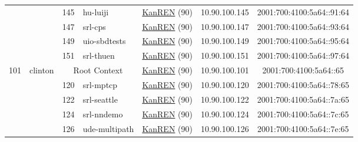 \begin{small}
\begin{center}
\begin{longtable}{|c|c|c|c|c|c|c|c|}
  &  & \tiny{145} & \multicolumn{1}{|l|}{\tiny{hu-luiji}} & \multicolumn{2}{|c|}{\tiny{\href{http://www.kanren.net}{KanREN} (90)}} & \tiny{10.90.100.145} & \tiny{2001:700:4100:5a64::91:64} \\* \cline{3-3}\cline{4-4}\cline{5-5}\cline{6-6}\cline{7-7}\cline{8-8}
  &  & \tiny{147} & \multicolumn{1}{|l|}{\tiny{srl-cps}} & \multicolumn{2}{|c|}{\tiny{\href{http://www.kanren.net}{KanREN} (90)}} & \tiny{10.90.100.147} & \tiny{2001:700:4100:5a64::93:64} \\* \cline{3-3}\cline{4-4}\cline{5-5}\cline{6-6}\cline{7-7}\cline{8-8}
  &  & \tiny{149} & \multicolumn{1}{|l|}{\tiny{uio-sbdtests}} & \multicolumn{2}{|c|}{\tiny{\href{http://www.kanren.net}{KanREN} (90)}} & \tiny{10.90.100.149} & \tiny{2001:700:4100:5a64::95:64} \\* \cline{3-3}\cline{4-4}\cline{5-5}\cline{6-6}\cline{7-7}\cline{8-8}
  &  & \tiny{151} & \multicolumn{1}{|l|}{\tiny{srl-thuen}} & \multicolumn{2}{|c|}{\tiny{\href{http://www.kanren.net}{KanREN} (90)}} & \tiny{10.90.100.151} & \tiny{2001:700:4100:5a64::97:64} \\ \hline
 \multirow{17}{*}{\tiny{101}} & \multicolumn{1}{|l|}{\multirow{17}{*}{\tiny{clinton}}} & \multicolumn{2}{|c|}{\tiny{Root Context}} & \multicolumn{2}{|c|}{\tiny{\href{http://www.kanren.net}{KanREN} (90)}} & \tiny{10.90.100.101} & \tiny{2001:700:4100:5a64::65} \\* \cline{3-3}\cline{4-4}\cline{5-5}\cline{6-6}\cline{7-7}\cline{8-8}
  &  & \tiny{120} & \multicolumn{1}{|l|}{\tiny{srl-mptcp}} & \multicolumn{2}{|c|}{\tiny{\href{http://www.kanren.net}{KanREN} (90)}} & \tiny{10.90.100.120} & \tiny{2001:700:4100:5a64::78:65} \\* \cline{3-3}\cline{4-4}\cline{5-5}\cline{6-6}\cline{7-7}\cline{8-8}
  &  & \tiny{122} & \multicolumn{1}{|l|}{\tiny{srl-seattle}} & \multicolumn{2}{|c|}{\tiny{\href{http://www.kanren.net}{KanREN} (90)}} & \tiny{10.90.100.122} & \tiny{2001:700:4100:5a64::7a:65} \\* \cline{3-3}\cline{4-4}\cline{5-5}\cline{6-6}\cline{7-7}\cline{8-8}
  &  & \tiny{124} & \multicolumn{1}{|l|}{\tiny{srl-nndemo}} & \multicolumn{2}{|c|}{\tiny{\href{http://www.kanren.net}{KanREN} (90)}} & \tiny{10.90.100.124} & \tiny{2001:700:4100:5a64::7c:65} \\* \cline{3-3}\cline{4-4}\cline{5-5}\cline{6-6}\cline{7-7}\cline{8-8}
  &  & \tiny{126} & \multicolumn{1}{|l|}{\tiny{ude-multipath}} & \multicolumn{2}{|c|}{\tiny{\href{http://www.kanren.net}{KanREN} (90)}} & \tiny{10.90.100.126} & \tiny{2001:700:4100:5a64::7e:65} \\* \cline{3-3}\cline{4-4}\cline{5-5}\cline{6-6}\cline{7-7}\cline{8-8}

\end{longtable}
\end{center}
\end{small}
